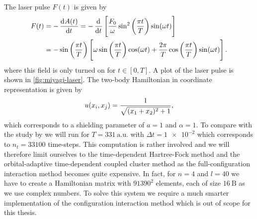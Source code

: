             The laser pulse $F(t)$ is given by \cite{miyagi_and_madsen}
            \begin{align}
                F(t)
                &= -\dod[]{A(t)}{t}
                = -\dod[]{}{t}\brak{
                    \frac{F_0}{\omega}
                    \sin^2\para{\frac{\pi t}{T}}
                    \sin(\omega t)
                }
                \\
                &=
                -\sin\para{\frac{\pi t}{T}}\brak{
                    \omega \sin\para{\frac{\pi t}{T}}
                    \cos(\omega t)
                    + \frac{2\pi}{T}
                    \cos\para{\frac{\pi t}{T}}
                    \sin(\omega t)
                }.
                \label{eq:miyagi-laser}
            \end{align}
            where this field is only turned on for $t \in [0, T]$.
            A plot of the laser pulse is shown in \autoref{fig:miyagi-laser}.
            The two-body Hamiltonian in coordinate representation is given by
            \begin{align}
                u(x_i, x_j) = \frac{1}{\sqrt{(x_1 + x_2)^2 + 1}},
            \end{align}
            which corresponds to a shielding parameter of $a = 1$ and $\alpha =
            1$.
            To compare with the study by \citeauthor{miyagi_and_madsen} we will
            run for $T = \SI{331}{\text{a.u.}}$ with $\Delta t = \num{1e-2}$
            which corresponds to $n_t = 33100$ time-steps.
            This computation is rather involved and we will therefore limit
            ourselves to the time-dependent Hartree-Fock method and the
            orbital-adaptive time-dependent coupled cluster method as the
            full-configuration interaction method becomes quite expensive.
            In fact, for $n = 4$ and $l = 40$ we have to create a Hamiltonian
            matrix with $91390^2$ elements, each of size $\SI{16}{\text{B}}$ as
            we use complex numbers.
            To solve this system we require a much smarter implementation of the
            configuration interaction method which is out of scope for this
            thesis.

